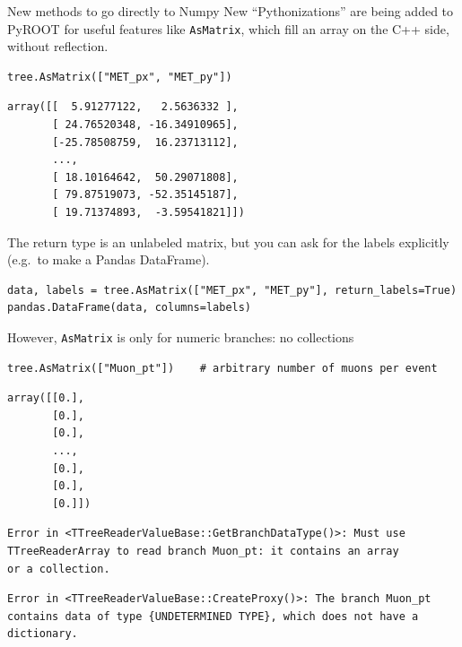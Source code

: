 \documentclass[aspectratio=169]{beamer}
\begin{document}
\begin{frame}[fragile]{New methods to go directly to Numpy}
\large
\vspace{0.5 cm}
New ``Pythonizations'' are being added to PyROOT for useful features like {\tt AsMatrix}, which fill an array on the C++ side, without reflection.

\small
\begin{verbatim}
tree.AsMatrix(["MET_px", "MET_py"])
\end{verbatim}
\begin{verbatim}
array([[  5.91277122,   2.5636332 ],
       [ 24.76520348, -16.34910965],
       [-25.78508759,  16.23713112],
       ...,
       [ 18.10164642,  50.29071808],
       [ 79.87519073, -52.35145187],
       [ 19.71374893,  -3.59541821]])
\end{verbatim}
\large

\vspace{0.25 cm}
The return type is an unlabeled matrix, but you can ask for the labels explicitly (e.g.\ to make a Pandas DataFrame).

\small
\begin{verbatim}
data, labels = tree.AsMatrix(["MET_px", "MET_py"], return_labels=True)
pandas.DataFrame(data, columns=labels)
\end{verbatim}
\end{frame}

\begin{frame}[fragile]{However, {\tt AsMatrix} is only for numeric branches: no collections}
\vspace{0.5 cm}

\small
\begin{verbatim}
tree.AsMatrix(["Muon_pt"])    # arbitrary number of muons per event
\end{verbatim}
\begin{verbatim}
array([[0.],
       [0.],
       [0.],
       ...,
       [0.],
       [0.],
       [0.]])
\end{verbatim}

\vspace{-0.2 cm}
\color{gray}
\begin{verbatim}
Error in <TTreeReaderValueBase::GetBranchDataType()>: Must use
TTreeReaderArray to read branch Muon_pt: it contains an array
or a collection.
\end{verbatim}
\begin{verbatim}
Error in <TTreeReaderValueBase::CreateProxy()>: The branch Muon_pt
contains data of type {UNDETERMINED TYPE}, which does not have a
dictionary.
\end{verbatim}
\end{frame}
\end{document}
